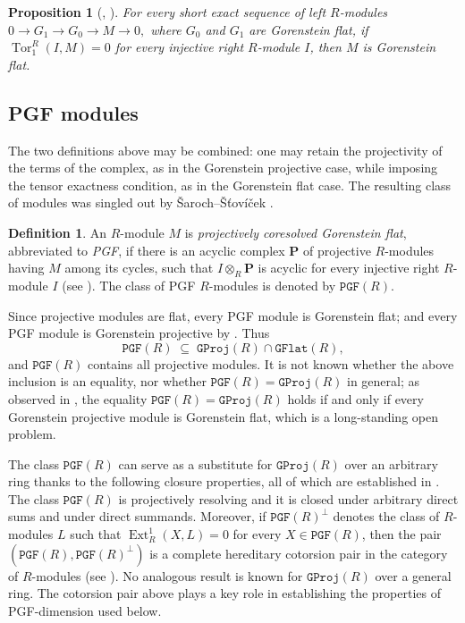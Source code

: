 \documentclass[12pt]{amsart}
\newtheorem{proposition}[theorem]{Proposition}
\theoremstyle{remark}
\theoremstyle{definition}
\newtheorem{definition}[theorem]{Definition}
\theoremstyle{plain}
\DeclareMathOperator{\Ext}{Ext}
\DeclareMathOperator{\Tor}{Tor}
\newcommand{\GFlat}{\mathtt{GFlat}}
\newcommand{\GProj}{\mathtt{GProj}}
\newcommand{\PGF}{\mathtt{PGF}}
\begin{document}
\begin{proposition}[{\cite[Theorem~2.3]{Ben}}, {\cite[Corollary~4.12]{SS}}]\label{prop2.1} For every short exact sequence of left $R$-modules $0\rightarrow G_1\rightarrow G_0 \rightarrow M \rightarrow 0,$ where $G_0$ and $G_1$ are Gorenstein flat, if $\Tor_1^R(I,M)=0$ for every injective right $R$-module $I$, then $M$ is Gorenstein flat.
\end{proposition}

\subsection{PGF modules}

The two definitions above may be combined: one may retain the projectivity of the terms of the complex, as in the Gorenstein projective case, while imposing the tensor exactness condition, as in the Gorenstein flat case. The resulting class of modules was singled out by \v{S}aroch--\v{S}\v{t}ov\'i\v{c}ek \cite{SS}.

\begin{definition}\label{def2.2} An $R$-module $M$ is \emph{projectively coresolved Gorenstein flat}, abbreviated to \emph{PGF}, if there is an acyclic complex $\mathbf P$ of projective $R$-modules having $M$ among its cycles, such that $I\otimes_R\mathbf P$ is acyclic for every injective right $R$-module $I$ (see \cite{SS}). The class of PGF $R$-modules is denoted by $\PGF(R)$.
\end{definition}

Since projective modules are flat, every PGF module is Gorenstein flat; and every PGF module is Gorenstein projective by \cite[Theorem~4.4]{SS}. Thus
\[
\PGF(R)\;\subseteq\;\GProj(R)\cap\GFlat(R),
\]
and $\PGF(R)$ contains all projective modules. It is not known whether the above inclusion is an equality, nor whether $\PGF(R)=\GProj(R)$ in general; as observed in \cite[Section~4]{SS}, the equality $\PGF(R)=\GProj(R)$ holds if and only if every Gorenstein projective module is Gorenstein flat, which is a long-standing open problem.

The class $\PGF(R)$ can serve as a substitute for $\GProj(R)$ over an arbitrary ring thanks to the following closure properties, all of which are established in \cite{SS}. The class $\PGF(R)$ is projectively resolving and it is closed under arbitrary direct sums and under direct summands. Moreover, if $\PGF(R)^{\perp}$ denotes the class of $R$-modules $L$ such that $\Ext^1_R(X,L)=0$ for every $X\in\PGF(R)$, then the pair $(\PGF(R),\PGF(R)^{\perp})$ is a complete hereditary cotorsion pair in the category of $R$-modules (see \cite[Theorem~4.9]{SS}). No analogous result is known for $\GProj(R)$ over a general ring.
The cotorsion pair above plays a key role in establishing the properties of PGF-dimension used below.
\end{document}
